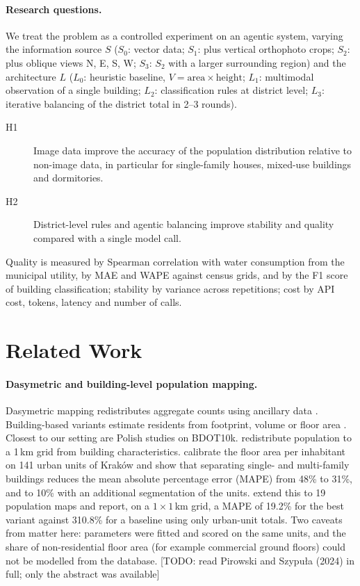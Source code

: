 \documentclass[11pt]{article}
\newcommand{\todo}[1]{{\color{red}[TODO: #1]}}
\begin{document}
\paragraph{Research questions.}
We treat the problem as a controlled experiment on an agentic system, varying the information source $S$ ($S_0$: vector data; $S_1$: plus vertical orthophoto crops; $S_2$: plus oblique views N, E, S, W; $S_3$: $S_2$ with a larger surrounding region) and the architecture $L$ ($L_0$: heuristic baseline, $V=\text{area}\times\text{height}$; $L_1$: multimodal observation of a single building; $L_2$: classification rules at district level; $L_3$: iterative balancing of the district total in 2--3 rounds).
\begin{description}
  \item[H1] Image data improve the accuracy of the population distribution relative to non-image data, in particular for single-family houses, mixed-use buildings and dormitories.
  \item[H2] District-level rules and agentic balancing improve stability and quality compared with a single model call.
\end{description}
Quality is measured by Spearman correlation with water consumption from the municipal utility, by MAE and WAPE against census grids, and by the F1 score of building classification; stability by variance across repetitions; cost by API cost, tokens, latency and number of calls.

\section{Related Work}

\paragraph{Dasymetric and building-level population mapping.}
Dasymetric mapping redistributes aggregate counts using ancillary data \citep{mennis2003generating}.
Building-based variants estimate residents from footprint, volume or floor area \citep{lwin2009gis,ural2011building}.
Closest to our setting are Polish studies on BDOT10k.
\citet{calka2016redistribution} redistribute population to a 1\,km grid from building characteristics.
\citet{pirowski2018detailed} calibrate the floor area per inhabitant on 141 urban units of Kraków and show that separating single- and multi-family buildings reduces the mean absolute percentage error (MAPE) from 48\% to 31\%, and to 10\% with an additional segmentation of the units.
\citet{pirowski2024dasymetric} extend this to 19 population maps and report, on a $1\times 1$\,km grid, a MAPE of 19.2\% for the best variant against 310.8\% for a baseline using only urban-unit totals.
Two caveats from \citet{pirowski2018detailed} matter here: parameters were fitted and scored on the same units, and the share of non-residential floor area (for example commercial ground floors) could not be modelled from the database.
\todo{read Pirowski and Szypuła (2024) in full; only the abstract was available}
\end{document}
